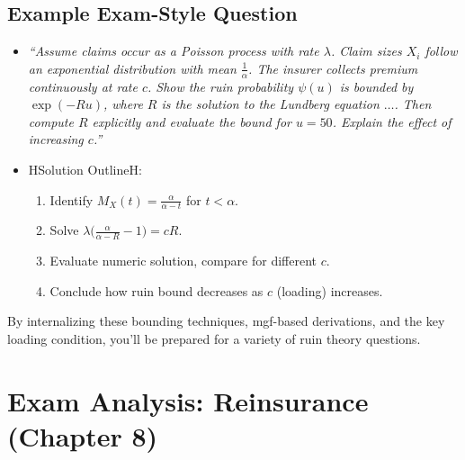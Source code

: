 \documentclass[13pt,a4paper]{article}
\begin{document}
\subsection{Example Exam-Style Question}
\begin{itemize}
  \item \emph{“Assume claims occur as a Poisson process with rate \(\lambda\). Claim sizes \(X_i\) follow an exponential distribution with mean \(\frac{1}{\alpha}\). The insurer collects premium continuously at rate \(c\). Show the ruin probability \(\psi(u)\) is bounded by \(\exp(-Ru)\), where \(R\) is the solution to the Lundberg equation \(\ldots\). Then compute \(R\) explicitly and evaluate the bound for \(u=50\). Explain the effect of increasing \(c\).”}
  \item HSolution OutlineH:
    \begin{enumerate}
      \item Identify \(M_X(t)=\frac{\alpha}{\alpha - t}\) for \(t<\alpha\).  
      \item Solve \(\lambda\bigl(\frac{\alpha}{\alpha - R}-1\bigr)=cR\).  
      \item Evaluate numeric solution, compare for different \(c\).  
      \item Conclude how ruin bound decreases as \(c\) (loading) increases.
    \end{enumerate}
\end{itemize}

\noindent
By internalizing these bounding techniques, mgf-based derivations, and the key loading condition, you’ll be prepared for a variety of ruin theory questions.

\section{Exam Analysis: Reinsurance (Chapter 8)}
\label{sec:reinsurance_exam_analysis}
\end{document}

